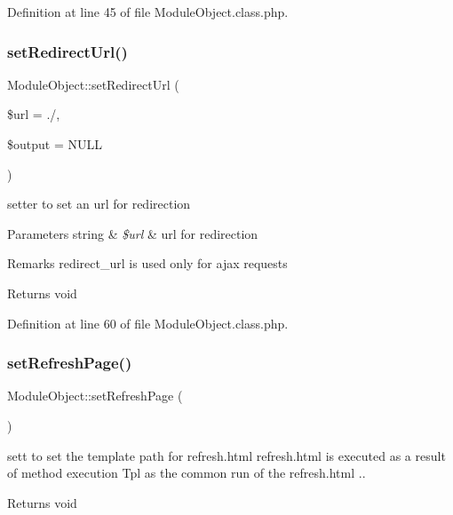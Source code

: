 Definition at line 45 of file Module\+Object.\+class.\+php.

\mbox{\label{classModuleObject_a6e3aac0a3457fe14845216d15dba98ec}} 
\subsubsection{\texorpdfstring{set\+Redirect\+Url()}{setRedirectUrl()}}
{\footnotesize\ttfamily Module\+Object\+::set\+Redirect\+Url (\begin{DoxyParamCaption}\item[{}]{\$url = {\ttfamily \textquotesingle{}./\textquotesingle{}},  }\item[{}]{\$output = {\ttfamily NULL} }\end{DoxyParamCaption})}

setter to set an url for redirection 
\begin{DoxyParams}[1]{Parameters}
string & {\em \$url} & url for redirection \\
\hline
\end{DoxyParams}
\begin{DoxyRemark}{Remarks}
redirect\+\_\+url is used only for ajax requests 
\end{DoxyRemark}
\begin{DoxyReturn}{Returns}
void 
\end{DoxyReturn}


Definition at line 60 of file Module\+Object.\+class.\+php.

\mbox{\label{classModuleObject_a6d0d3436c8c64591e1a3534647714969}} 
\subsubsection{\texorpdfstring{set\+Refresh\+Page()}{setRefreshPage()}}
{\footnotesize\ttfamily Module\+Object\+::set\+Refresh\+Page (\begin{DoxyParamCaption}{ }\end{DoxyParamCaption})}

sett to set the template path for refresh.\+html refresh.\+html is executed as a result of method execution Tpl as the common run of the refresh.\+html .. \begin{DoxyReturn}{Returns}
void 
\end{DoxyReturn}


